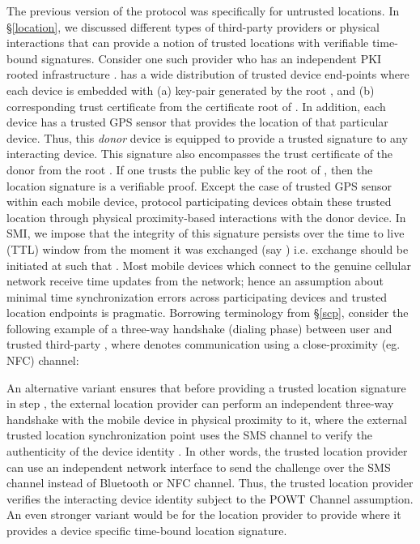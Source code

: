 \documentclass[letterpaper,twocolumn]{sig-alternate}
\begin{document}
The previous version of the protocol was specifically for untrusted locations. In \S \ref{location}, we discussed different types of third-party providers or physical interactions that can provide a notion of trusted locations with verifiable time-bound signatures. Consider one such provider  who has an independent PKI rooted infrastructure \cite{herzberg2000access}.  has a wide distribution of trusted device end-points where each device is embedded with (a) key-pair generated by the root , and (b) corresponding trust certificate from the certificate root of . In addition, each device has a trusted GPS sensor that provides the location  of that particular device. Thus, this {\em donor} device is
equipped to provide a trusted signature  to any interacting device. This signature also encompasses the trust certificate of the donor from the root . If one trusts the public key of the root of , then the location signature  is a verifiable proof. Except the case of trusted GPS sensor within each mobile device, protocol participating devices obtain these trusted location through physical proximity-based interactions with the donor device. In SMI, we impose that the integrity of this signature persists over the time to live (TTL) window  from the moment it was exchanged (say ) i.e. exchange  should be initiated at  such that . Most mobile devices which connect to the genuine cellular network receive time updates from the network; hence an assumption about minimal time synchronization errors across participating devices and trusted location endpoints is pragmatic. Borrowing terminology from \S \ref{scp}, consider the following example of a three-way handshake (dialing phase) between user  and trusted third-party , where  denotes communication using a close-proximity (eg. NFC) channel: 

\vspace{-2mm}

\vspace{-6mm}

An alternative variant ensures that before providing a trusted location signature  in step , the external location provider can perform an independent three-way handshake with the mobile device in physical proximity to it, where the external trusted location synchronization point uses the SMS channel to verify the authenticity of the device identity . In other words, the trusted location provider can use an independent network interface to send the challenge over the SMS channel instead of Bluetooth or NFC channel. Thus, the trusted location provider verifies the interacting device identity  subject to the POWT Channel assumption. An even stronger variant would be for the location provider to provide  where it provides a device specific time-bound location signature. 
\end{document}
